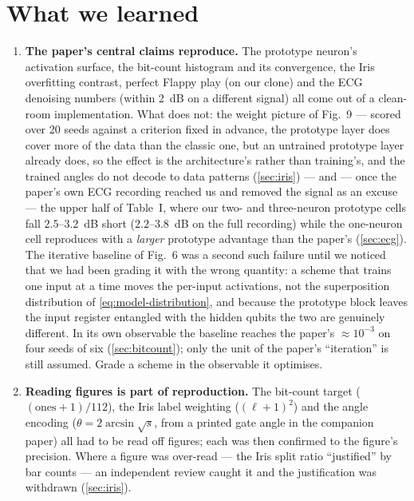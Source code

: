 \section{What we learned}
\label{sec:learnings}

\begin{enumerate}[leftmargin=*,itemsep=2pt]
\item \textbf{The paper's central claims reproduce.}  The prototype neuron's activation surface,
the bit-count histogram and its convergence, the Iris overfitting contrast, perfect Flappy play
(on our clone) and the ECG denoising numbers (within 2~dB on a different signal) all come out of
a clean-room implementation.  What does not: the weight picture of Fig.~9 --- scored over 20
seeds against a criterion fixed in advance, the prototype layer does cover more of the data than
the classic one, but an untrained prototype layer already does, so the effect is the
architecture's rather than training's, and the trained angles do not decode to data patterns
(\cref{sec:iris}) --- and --- once the paper's own ECG recording reached us and removed
the signal as an excuse --- the upper half of Table~I, where our two- and three-neuron prototype
cells fall $2.5$--$3.2$~dB short ($2.2$--$3.8$~dB on the full recording) while the one-neuron cell reproduces with a \emph{larger}
prototype advantage than the paper's (\cref{sec:ecg}).  The iterative baseline of Fig.~6 was a second such failure until
we noticed that we had been grading it with the wrong quantity: a scheme that trains one input at
a time moves the per-input activations, not the superposition distribution of
\cref{eq:model-distribution}, and because the prototype block leaves the input register entangled
with the hidden qubits the two are genuinely different.  In its own observable the baseline
reaches the paper's $\approx 10^{-3}$ on four seeds of six (\cref{sec:bitcount}); only the unit
of the paper's ``iteration'' is still assumed.  Grade a scheme in the observable it optimises.

\item \textbf{Reading figures is part of reproduction.}  The bit-count target
($(\text{ones}+1)/112$), the Iris label weighting ($(\ell+1)^2$) and the angle encoding
($\theta = 2\arcsin\sqrt s$, from a printed gate angle in the companion paper) all had to be
read off figures; each was then confirmed to the figure's precision.  Where a figure was
over-read --- the Iris split ratio ``justified'' by bar counts --- an independent review caught
it and the justification was withdrawn (\cref{sec:iris}).


\end{enumerate}
